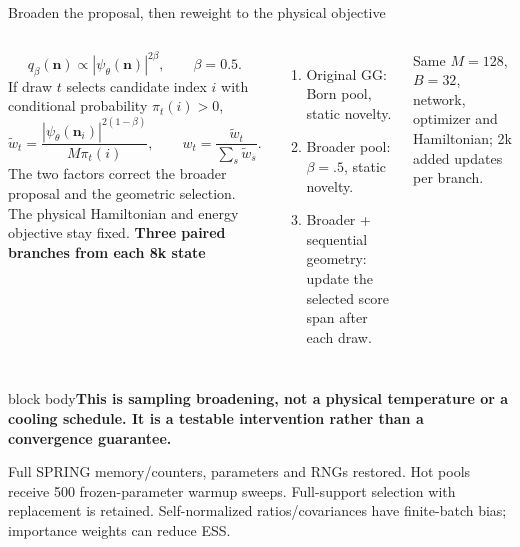 \documentclass[aspectratio=169,10pt]{beamer}
\newcommand{\src}[1]{\vfill{\fontsize{6.3}{7.5}\selectfont\color{muted}#1\par}}
\newcommand{\take}[1]{\vspace{1mm}\begin{beamercolorbox}[sep=1.6mm,wd=\textwidth]{block body}\small\color{teal}\textbf{#1}\end{beamercolorbox}}
\newcommand{\nn}{\mathbf n}
\begin{document}
\begin{frame}{Broaden the proposal, then reweight to the physical objective}
\begin{columns}[T,onlytextwidth]
\[
q_\beta(\nn)\propto|\psi_\theta(\nn)|^{2\beta},\qquad \beta=0.5.
\]
\small If draw $t$ selects candidate index $i$ with conditional probability $\pi_t(i)>0$,
\[
\widetilde w_t=\frac{|\psi_\theta(\nn_i)|^{2(1-\beta)}}{M\pi_t(i)},\qquad
w_t=\frac{\widetilde w_t}{\sum_s\widetilde w_s}.
\]
\small The two factors correct the broader proposal and the geometric selection. The physical Hamiltonian and energy objective stay fixed.
\textbf{Three paired branches from each 8k state}\par\medskip
\begin{enumerate}\setlength\itemsep{5pt}
\item Original GG: Born pool, static novelty.
\item Broader pool: $\beta=.5$, static novelty.
\item Broader + sequential geometry: update the selected score span after each draw.
\end{enumerate}
\small Same $M=128$, $B=32$, network, optimizer and Hamiltonian; 2k added updates per branch.
\end{columns}
\take{This is sampling broadening, not a physical temperature or a cooling schedule. It is a testable intervention rather than a convergence guarantee.}
\src{Full SPRING memory/counters, parameters and RNGs restored. Hot pools receive 500 frozen-parameter warmup sweeps. Full-support selection with replacement is retained. Self-normalized ratios/covariances have finite-batch bias; importance weights can reduce ESS.}
\end{frame}
\end{document}
